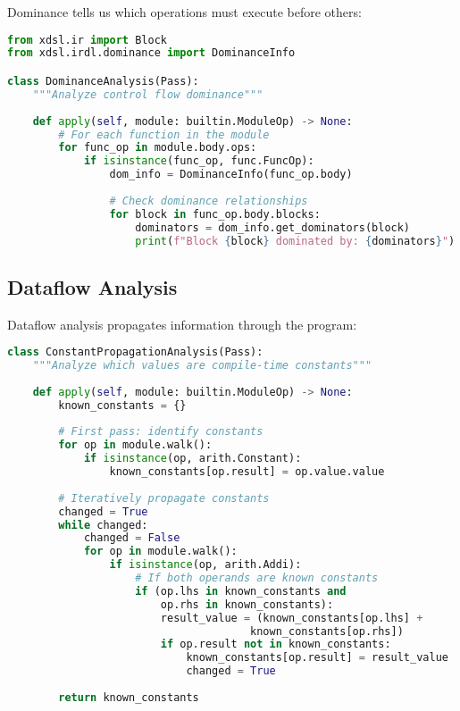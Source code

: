 \documentclass[11pt,a4paper]{article}
\begin{document}
Dominance tells us which operations must execute before others:

\begin{lstlisting}[language=Python, caption=Dominance Analysis]
from xdsl.ir import Block
from xdsl.irdl.dominance import DominanceInfo

class DominanceAnalysis(Pass):
    """Analyze control flow dominance"""
    
    def apply(self, module: builtin.ModuleOp) -> None:
        # For each function in the module
        for func_op in module.body.ops:
            if isinstance(func_op, func.FuncOp):
                dom_info = DominanceInfo(func_op.body)
                
                # Check dominance relationships
                for block in func_op.body.blocks:
                    dominators = dom_info.get_dominators(block)
                    print(f"Block {block} dominated by: {dominators}")
\end{lstlisting}

\subsection{Dataflow Analysis}

Dataflow analysis propagates information through the program:

\begin{lstlisting}[language=Python, caption=Constant Propagation Analysis]
class ConstantPropagationAnalysis(Pass):
    """Analyze which values are compile-time constants"""
    
    def apply(self, module: builtin.ModuleOp) -> None:
        known_constants = {}
        
        # First pass: identify constants
        for op in module.walk():
            if isinstance(op, arith.Constant):
                known_constants[op.result] = op.value.value
        
        # Iteratively propagate constants
        changed = True
        while changed:
            changed = False
            for op in module.walk():
                if isinstance(op, arith.Addi):
                    # If both operands are known constants
                    if (op.lhs in known_constants and 
                        op.rhs in known_constants):
                        result_value = (known_constants[op.lhs] + 
                                      known_constants[op.rhs])
                        if op.result not in known_constants:
                            known_constants[op.result] = result_value
                            changed = True
        
        return known_constants
\end{lstlisting}
\end{document}
